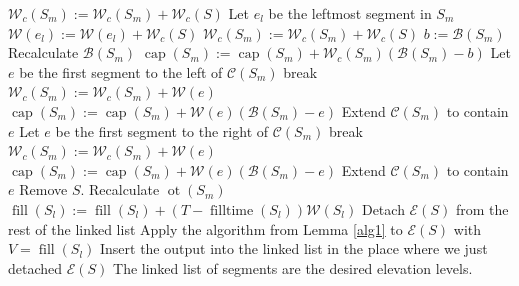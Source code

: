 \documentclass[11pt,a4paper]{article}
\DeclareMathOperator{\capp}{cap}
\DeclareMathOperator{\ot}{ot}
\DeclareMathOperator{\Fill}{fill}
\DeclareMathOperator{\filltime}{filltime}
\begin{document}
\begin{algorithmic}[1]
                \State $\mathcal{W}_c(S_m) := \mathcal{W}_c(S_m) + \mathcal{W}_c(S)$
              \EndIf
            \Else
              \State Let $e_l$ be the leftmost segment in $S_m$
              \State $\mathcal{W}(e_l) := \mathcal{W}(e_l) + \mathcal{W}_c(S)$
                \State $\mathcal{W}_c(S_m) := \mathcal{W}_c(S_m) + \mathcal{W}_c(S)$
              \EndIf
            \EndIf
            \State $b := \mathcal{B}(S_m)$
            \State Recalculate $\mathcal{B}(S_m)$
              \State $\capp(S_m) := \capp(S_m) + \mathcal{W}_c(S_m)(\mathcal{B}(S_m) - b)$
                \State Let $e$ be the first segment to the left of $\mathcal{C}(S_m)$
                    \State break
                \EndIf
                \State $\mathcal{W}_c(S_m) := \mathcal{W}_c(S_m) + \mathcal{W}(e)$
                \State $\capp(S_m) := \capp(S_m) + \mathcal{W}(e)(\mathcal{B}(S_m) - e)$
                \State Extend $\mathcal{C}(S_m)$ to contain $e$
              \EndWhile
                \State Let $e$ be the first segment to the right of $\mathcal{C}(S_m)$
                    \State break
                \EndIf
                \State $\mathcal{W}_c(S_m) := \mathcal{W}_c(S_m) + \mathcal{W}(e)$
                \State $\capp(S_m) := \capp(S_m) + \mathcal{W}(e)(\mathcal{B}(S_m) - e)$
                \State Extend $\mathcal{C}(S_m)$ to contain $e$
              \EndWhile
            \EndIf
            \State Remove $S$.
            \State Recalculate $\ot(S_m)$
        \EndIf
    \EndWhile
      \State $\Fill(S_l) := \Fill(S_l) + (T - \filltime(S_l))\mathcal{W}(S_l)$
      \State Detach $\mathcal{E}(S)$ from the rest of the linked list
      \State Apply the algorithm from Lemma \ref{alg1} to $\mathcal{E}(S)$ with $V = \Fill(S_l)$
      \State Insert the output into the linked list in the place where we just detached $\mathcal{E}(S)$
    \EndFor
    \State The linked list of segments are the desired elevation levels.
\end{algorithmic}
\end{document}
